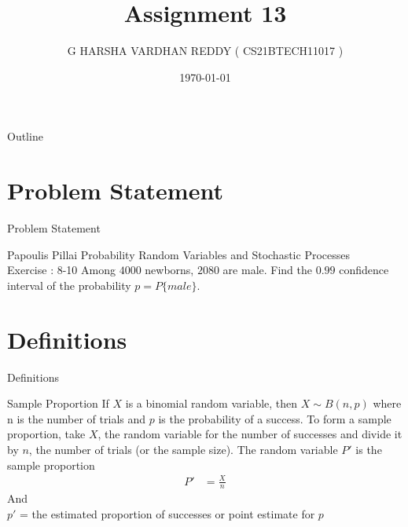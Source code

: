 \documentclass{beamer}
\title{Assignment 13}
\author[CS21BTECH11017]{G HARSHA VARDHAN REDDY ( CS21BTECH11017 )}
\date{\today}
\begin{document}
\begin{frame}
    \titlepage 
\end{frame}

\logo{}


\begin{frame}{Outline}
    \tableofcontents
\end{frame}

\section{Problem Statement}
\begin{frame}{Problem Statement}
    \begin{block} {Papoulis Pillai Probability Random Variables and Stochastic Processes\\ 
    Exercise : 8-10}
    Among $4000$ newborns, $2080$ are male. Find the $0.99$ confidence interval of the probability
$p = P\{male\}$.
    \end{block}
\end{frame}
\section{Definitions}
\begin{frame}{Definitions}
    \begin{block}{Sample Proportion}
     If $X$ is a binomial random variable, then $X \sim B(n, p)$ where n is the number of trials and $p$ is the probability of a success. To form a sample proportion, take $X$, the random variable for the number of successes and divide it by $n$, the number of trials (or the sample size). The random variable $P'$ is the sample proportion
     \begin{align}
         P' &= \frac{X}{n} 
     \end{align}
And \\
    $p'$ =  the estimated proportion of successes or point estimate for $p$
    \end{block}
\end{frame}
\end{document}
